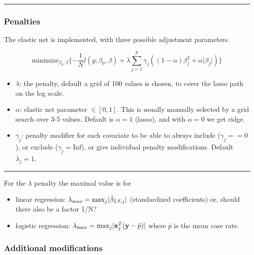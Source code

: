 \documentclass[
  letterpaper,
  DIV=11,
  numbers=noendperiod]{scrartcl}
\providecommand{\tightlist}{%
  \setlength{\itemsep}{0pt}\setlength{\parskip}{0pt}}\usepackage{longtable,booktabs,array}
\begin{document}
\begin{center}\rule{0.5\linewidth}{0.5pt}\end{center}

\hypertarget{penalties}{%
\subsubsection{Penalties}\label{penalties}}

The elastic net is implemented, with three possible adjustment
parameters.

\[ \text{minimize}_{\beta_0,\beta} \{ -\frac{1}{N} l(y;\beta_0,\beta)+\lambda \sum_{j=1}^p
\gamma_j ((1-\alpha)\beta_j^2+\alpha \lvert \beta_j \rvert)\}\]

\begin{itemize}
\tightlist
\item
  \(\lambda\): the penalty, default a grid of 100 values is chosen, to
  cover the lasso path on the log scale.
\item
  \(\alpha\): elastic net parameter \(\in [0,1]\). This is usually
  manually selected by a grid search over 3-5 values. Default is
  \(\alpha=1\) (lasso), and with \(\alpha=0\) we get ridge.
\item
  \(\gamma_j\): penalty modifier for each covariate to be able to always
  include (\(\gamma_j==0\)), or exclude (\(\gamma_j=\text{Inf}\)), or
  give individual penalty modifications. Default \(\lambda_j=1\).
\end{itemize}

\begin{center}\rule{0.5\linewidth}{0.5pt}\end{center}

For the \(\lambda\) penalty the maximal value is for

\begin{itemize}
\tightlist
\item
  linear regression:
  \(\lambda_{\text max}=\text{max}_j \lvert \hat{\beta}_{LS,j} \rvert\)
  (standardized coefficients) or, should there also be a factor 1/N?
\item
  logistic regression:
  \(\lambda_{\text max}=\text{max}_{j}\lvert {\bf x}_j ^T ({\bf y}-\bar{p}) \rvert\)
  where \(\bar p\) is the mean case rate.
\end{itemize}

\hypertarget{additional-modifications}{%
\subsubsection{Additional
modifications}\label{additional-modifications}}
\end{document}
